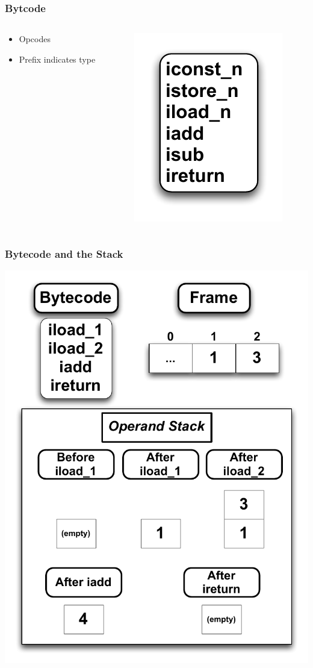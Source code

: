 \documentclass{beamer}
\begin{document}
\begin{frame}
\frametitle{Bytcode}
\begin{columns}
\begin{column}{0.5\textwidth}
\begin{itemize}	
\item Opcodes
\item Prefix indicates type
\end{itemize}
\end{column}

\begin{column}{0.5\textwidth}
\includegraphics[height=1\textheight]{Illustrations/opcodes.pdf}
\end{column}
\end{columns}
\end{frame}

\begin{frame}
\frametitle{Bytecode and the Stack}

   \includegraphics[width=.4\textwidth]{Illustrations/stackBytecode.pdf}
       \\

\end{frame}
\end{document}
